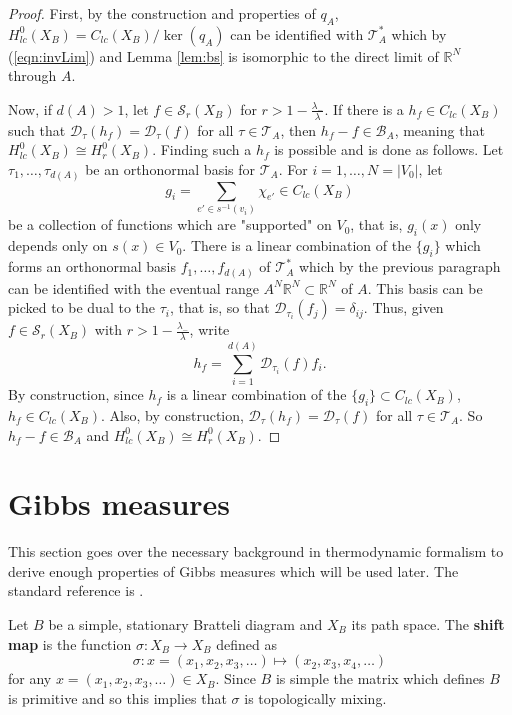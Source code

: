 \documentclass[12pt]{amsart}
\theoremstyle{plain}
\theoremstyle{definition}
\begin{document}
\begin{proof}
     First, by the construction and properties of $q_A$, $H^0_{lc}(X_B) = C_{lc}(X_B)/\ker (q_A) $ can be identified with $\mathcal{T}^{*}_A$ which by (\ref{eqn:invLim}) and Lemma \ref{lem:bs} is isomorphic to the direct limit of $\mathbb{R}^N$ through $A$.

    Now, if $d(A)>1$, let $f\in \mathcal{S}_r(X_B)$ for $r> 1-\frac{\lambda_-}{\lambda}$. If there is a $h_f\in C_{lc}(X_B)$ such that $\mathcal{D}_\tau(h_f) = \mathcal{D}_\tau(f)$ for all $\tau\in \mathcal{T}_A$, then $h_f - f\in \mathcal{B}_A$, meaning that $H^0_{lc}(X_B)\cong H^0_r(X_B)$.
    Finding such a $h_f$ is possible and is done as follows.  Let $\tau_1,\dots,\tau_{d(A)}$ be an orthonormal basis for $\mathcal{T}_A$. For $i = 1,\dots, N = |V_0|$, let 
    $$g_i = \sum_{e'\in s^{-1}(v_i)} \chi_{e'}\in C_{lc}(X_B)$$
    be a collection of functions which are "supported" on $V_0$, that is, $g_i(x)$ only depends only on $s(x)\in V_0$. There is a linear combination of the $\{g_i\}$ which forms an orthonormal basis $f_1,\dots, f_{d(A)}$ of $\mathcal{T}^*_A$ which by the previous paragraph can be identified with the eventual range $A^N\mathbb{R}^N\subset \mathbb{R}^N$ of $A$. This basis can be picked to be dual to the $\tau_i$, that is, so that $\mathcal{D}_{\tau_i}(f_j) = \delta_{ij}$. Thus, given $f\in \mathcal{S}_r(X_B)$ with $r> 1-\frac{\lambda_-}{\lambda}$, write
    $$h_f = \sum_{i=1}^{d(A)} \mathcal{D}_{\tau_i}(f) f_i.$$
    By construction, since $h_f$ is a linear combination of the $\{g_i\}\subset C_{lc}(X_B)$, $h_f\in C_{lc}(X_B)$. Also, by construction, $\mathcal{D}_\tau(h_f) = \mathcal{D}_\tau(f)$ for all $\tau\in\mathcal{T}_A$. So $h_f - f\in \mathcal{B}_A$ and $H^0_{lc}(X_B)\cong H^0_r(X_B)$.
\end{proof}
\section{Gibbs measures}
\label{sec:thermo}
This section goes over the necessary background in thermodynamic formalism to derive enough properties of Gibbs measures which will be used later. The standard reference is \cite{Bowen:book}.

Let $B$ be a simple, stationary Bratteli diagram and $X_B$ its path space. The \textbf{shift map} is the function $\sigma:X_B\rightarrow X_B$ defined as
$$\sigma:x = (x_1,x_2,x_3,\dots) \mapsto (x_2,x_3,x_4,\dots)$$
for any $x = (x_1,x_2,x_3,\dots)\in X_B$. Since $B$ is simple the matrix which defines $B$ is primitive and so this implies that $\sigma$ is topologically mixing. 
\end{document}
